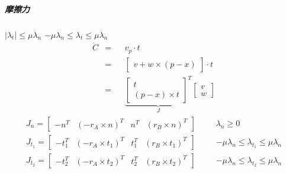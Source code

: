 \subparagraph{摩擦力}

\begin{itemize}
            $|\lambda_t|\leq\mu\lambda_n$
            $-\mu\lambda_n\leq\lambda_t\leq\mu\lambda_n$
        \begin{equation}
            \begin{aligned}
                \dot{C} &=&& v_p \cdot t \\
                        &=&& \begin{bmatrix}v+w\times(p-x)\end{bmatrix}\cdot t \\
                        &=&& \underbrace{\begin{bmatrix}t\\(p-x)\times t\end{bmatrix}^T}_J \begin{bmatrix}v\\w\end{bmatrix}
            \end{aligned}
        \end{equation}
        \begin{equation}
            \begin{aligned}
                J_n=\begin{bmatrix}-n^T & (-r_A\times n)^T & n^T & (r_B\times n)^T\end{bmatrix}             &&& \lambda_n\geq0 \\
                J_{t_1}=\begin{bmatrix}-t_1^T & (-r_A\times t_1)^T & t_1^T & (r_B\times t_1)^T\end{bmatrix} &&& -\mu\lambda_n\leq\lambda_{t_1}\leq\mu\lambda_n \\
                J_{t_2}=\begin{bmatrix}-t_2^T & (-r_A\times t_2)^T & t_2^T & (r_B\times t_2)^T\end{bmatrix} &&& -\mu\lambda_n\leq\lambda_{t_2}\leq\mu\lambda_n \\
            \end{aligned}
        \end{equation}
    
\end{itemize}

